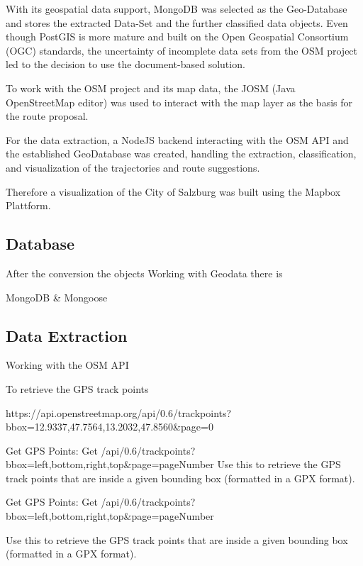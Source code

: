 With its geospatial data support, MongoDB was selected as the Geo-Database and stores the extracted Data-Set and the further classified data objects. Even though PostGIS is more mature and built on the Open Geospatial Consortium (OGC) standards, the uncertainty of incomplete data sets from the OSM project led to the decision to use the document-based solution.

To work with the OSM project and its map data, the JOSM (Java OpenStreetMap editor) was used to interact with the map layer as the basis for the route proposal. 

For the data extraction, a NodeJS backend interacting with the OSM API and the established GeoDatabase was created, handling the extraction, classification, and visualization of the trajectories and route suggestions.

Therefore a visualization of the City of Salzburg was built using the Mapbox Plattform. 




\subsection{Database}

After the conversion the objects 
Working with Geodata there is 

MongoDB & Mongoose

\subsection{Data Extraction}

Working with the OSM API

To retrieve the GPS track points 

https://api.openstreetmap.org/api/0.6/trackpoints?bbox=12.9337,47.7564,13.2032,47.8560&page=0

Get GPS Points: Get /api/0.6/trackpoints?bbox=left,bottom,right,top&page=pageNumber
Use this to retrieve the GPS track points that are inside a given bounding box (formatted in a GPX format).

Get GPS Points: Get /api/0.6/trackpoints?bbox=left,bottom,right,top&page=pageNumber


Use this to retrieve the GPS track points that are inside a given bounding box (formatted in a GPX format).

